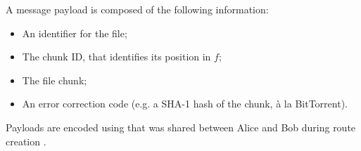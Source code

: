 A message payload is composed of the following information:

\begin{itemize}
  \item An identifier for the file;
  \item The chunk ID, that identifies its position in $f$;
  \item The file chunk;
  \item An error correction code (e.g. a SHA-1 hash of the chunk, à la BitTorrent\cite{bt_bep3}).
\end{itemize}

Payloads are encoded using \datakey that was shared between Alice and Bob during route creation .













